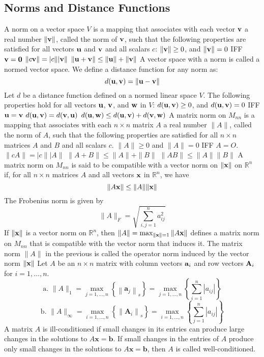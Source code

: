 \documentclass{article}
\begin{document}
    \subsection{Norms and Distance Functions} 
    \begin{outline}
        \1 A norm on a vector space $V$ is a mapping that associates with each vector $\vb v$ a real number $\|\vb v\|$, called the norm of $\vb v$, such that the following properties are satisfied for all vectors $\vb u$ and $\vb v$ and all scalars $c$:
		\2 \(\|\vb v\|\geq 0\), and \(\|\vb v\|=0\) IFF \(\vb v=\vb 0\)
		\2 \(\|c\vb v\|=|c\||\vb v\|\)
		\2 \(\|\vb u+\vb v\|\leq\|\vb u\|+\|\vb v\|\)
	\1 A vector space with a norm is called a normed vector space. 
	\1 We define a distance function for any norm as: \[d(\vb u,\vb v)=\|\vb u-\vb v\|\]
	\1 Let $d$ be a distance function defined on a normed linear space $V$. The following properties hold for all vectors $\vb u$, $\vb v$, and $\vb w$ in $V$:
		\2 \(d(\vb u,\vb v)\geq 0\), and \(d(\vb u,\vb v)=0\) IFF \(\vb u=\vb v\)
		\2 \(d(\vb u,\vb v)=d(\vb v,\vb u)\) 
        \2 \(d(\vb u,\vb w)\leq d(\vb u,\vb v)+d(\vb v,\vb w)\)
    \1 A matrix norm on \(M_{nn}\) is a mapping that associates with each \(n\times n\) matrix $A$ a real number $\|A\|$, called the norm of $A$, such that the following properties are satisfied for all \(n\times n\) matrices $A$ and $B$ and all scalars $c$. 
        \2 \(\|A\|\geq 0\) and \(\|A\|=0\) IFF \(A=O\). 
        \2 \(\|cA\|=|c\||A\|\)
        \2 \(\|A+B\|\leq\|A\|+\|B\|\)
        \2 \(\|AB\|\leq\|A\|\|B\|\)
    \1 A matrix norm on $M_{nn}$ is said to be compatible with a vector norm on \(\|\vb x\|\) on \(\mathbb R^n\) if, for all \(n\times n\) matrices $A$ and all vectors $\vb x$ in \(\mathbb R^n\), we have \[\|A\vb x\|\leq\|A\|\|\vb x\|\]
    \1 The Frobenius norm is given by \[\|A\|_F=\sqrt{\sum^n_{i,j=1}a^2_{ij}}\]
    \1 If \(\|\vb x\|\) is a vector norm on \(\mathbb R^n\), then \(\|A\|=\max_{\|\vb x\|=1}\|A\vb x\|\) defines a matrix norm on $M_{nn}$ that is compatible with the vector norm that induces it. 
    \1 The matrix norm $\|A\|$ in the previous is called the operator norm induced by the vector norm \(\|\vb x\|\)
    \1 Let $A$ be an \(n\times n\) matrix with column vectors \(\vb a_i\) and row vectors $\vb A_i$ for \(i=1,\ldots,n\). \[\text{a. }\|A\|_{1}=\max _{j=1, \ldots, n}\left\{\left\|\mathbf{a}_{j}\right\|_{s}\right\}=\max _{j=1, \ldots, n}\left\{\sum_{i=1}^{n}\left|a_{i j}\right|\right\}\]\[\text{b. }\|A\|_{\infty}=\max _{i=1, \ldots, n}\left\{\left\|\mathbf{A}_{i}\right\|_{s}\right\}=\max _{i=1, \ldots, n}\left\{\sum_{j=1}^{n}\left|a_{i j}\right|\right\}\]
    \1 A matrix $A$ is ill-conditioned if small changes in its entries can produce large changes in the solutions to $A \mathbf{x}=\mathbf{b}$. If small changes in the entries of $A$ produce only small changes in the solutions to $A \mathbf{x}=\mathbf{b}$, then $A$ is called well-conditioned.

    \end{outline}
\end{document}
